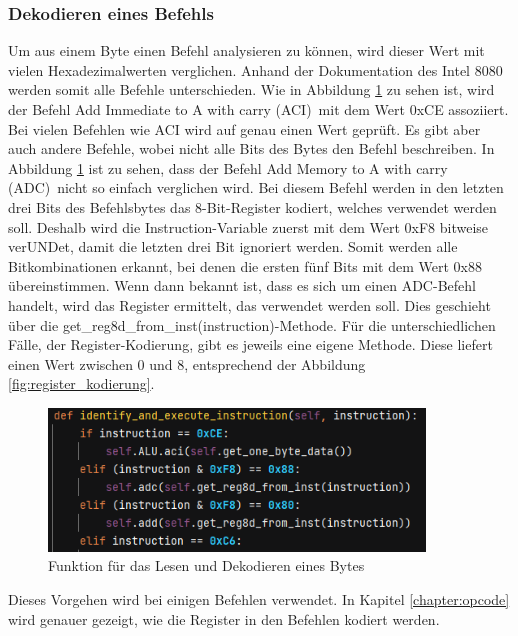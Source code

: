 \documentclass[12pt]{article}
\newcommand{\imgSpaceBefore}{\vspace{10pt}}
\begin{document}
\subsubsection{Dekodieren eines Befehls}
\noindent
Um aus einem Byte einen Befehl analysieren zu können, wird dieser Wert mit vielen Hexadezimalwerten verglichen. Anhand der Dokumentation des Intel 8080 werden somit alle Befehle unterschieden.
Wie in  Abbildung \ref{fig:ReadInstruction} zu sehen ist, wird der Befehl \glqq Add Immediate to A with carry (ACI)\grqq\ mit dem Wert 0xCE assoziiert.
Bei vielen Befehlen wie ACI wird auf genau einen Wert geprüft. Es gibt aber auch andere Befehle, wobei nicht alle Bits des Bytes den Befehl beschreiben. In Abbildung \ref{fig:ReadInstruction} ist zu sehen, dass der Befehl \glqq Add Memory to A with carry (ADC)\grqq\ nicht so einfach verglichen wird. Bei diesem Befehl werden in den letzten drei Bits des Befehlsbytes das 8-Bit-Register kodiert, welches verwendet werden soll. Deshalb wird die Instruction-Variable zuerst mit dem Wert 0xF8 bitweise verUNDet, damit die letzten drei Bit ignoriert werden. Somit werden alle Bitkombinationen erkannt, bei denen die ersten fünf Bits mit dem Wert 0x88 übereinstimmen. Wenn dann bekannt ist, dass es sich um einen ADC-Befehl handelt, wird das Register ermittelt, das verwendet werden soll. Dies geschieht über die get\_reg8d\_from\_inst(instruction)-Methode. Für die unterschiedlichen Fälle, der Register-Kodierung, gibt es jeweils eine eigene Methode. Diese liefert einen Wert zwischen 0 und 8, entsprechend der Abbildung \ref{fig:register_kodierung}.\imgSpaceBefore

\begin{figure}[h]
\centering
\includegraphics[width=10cm]{Bilder/ReadInstruction}
\caption{Funktion für das Lesen und Dekodieren eines Bytes}
\label{fig:ReadInstruction}
\end{figure}

\noindent
Dieses Vorgehen wird bei einigen Befehlen verwendet. In Kapitel \ref{chapter:opcode} wird genauer gezeigt, wie die Register in den Befehlen kodiert werden.

\newpage
\end{document}
